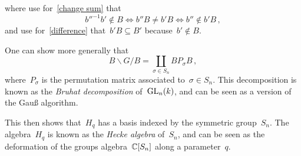 where use for~\eqref{change sum} that
\[
        b''^{-1} b' \notin  B
  \iff  b'' B \neq b' B
  \iff  b'' \notin b' B \,,
\]
and use for~\eqref{difference} that~$b' B \subseteq B'$ because~$b' \notin B$.


\begin{remark}
  One can show more generally that
  \[
      B \backslash G / B
    = \coprod_{\sigma \in S_n} B P_\sigma B \,,
  \]
  where~$P_\sigma$ is the permutation matrix associated to~$\sigma \in S_n$.
  This decomposition is known as the \emph{Bruhat decomposition} of~$\operatorname{GL}_n(k)$, and can be seen as a version of the Gauß algorithm.
  
  This then shows that~$H_q$ has a basis indexed by the symmetric group~$S_n$.
  The algebra~$H_q$ is known as the \emph{Hecke algebra} of~$S_n$, and can be seen as the deformation of the groups algebra~$\mathbb{C}[S_n]$ along a parameter~$q$.
\end{remark}

































